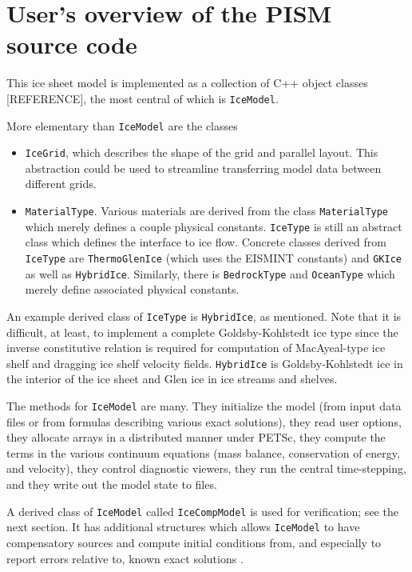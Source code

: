 \documentclass[11pt,final]{amsart}
\renewcommand{\t}[1]{\texttt{#1}}
\begin{document}
\section{User's overview of the PISM source code}  This ice sheet model is implemented as a collection of C++ object classes [REFERENCE], the most central of which is \t{IceModel}.

More elementary than \t{IceModel} are the classes\begin{itemize}
\item \t{IceGrid}, which describes the shape of the grid and parallel
layout. This abstraction could be used to streamline transferring model data between
different grids.
\item \t{MaterialType}.  Various materials are derived from the class \t{MaterialType} which merely defines a couple
physical constants. \t{IceType} is still an abstract class which defines the interface to
ice flow. Concrete classes derived from \t{IceType} are \t{ThermoGlenIce} (which uses the
EISMINT constants) and \t{GKIce} as well as \t{HybridIce}.  Similarly, there is \t{BedrockType} and \t{OceanType} which merely define
associated physical constants.\end{itemize}

An example derived class of \t{IceType} is \t{HybridIce}, as mentioned.  Note that it is difficult, at least, to implement a complete Goldsby-Kohlstedt ice type \cite{GoldsbyKohlstedt} since the inverse constitutive
relation is required for computation of MacAyeal-type ice shelf and dragging ice shelf \cite{MacAyeal} velocity fields. \t{HybridIce} is Goldsby-Kohlstedt ice in the interior of the ice sheet and Glen ice in ice streams and
shelves.

The methods for \t{IceModel} are many.  They initialize the model (from input data files or from formulas describing various exact solutions), they read user options, they allocate arrays in a distributed manner under PETSc, they compute the terms in the various continuum equations (mass balance, conservation of energy, and velocity), they control diagnostic viewers, they run the central time-stepping, and they write out the model state to files.

A derived class of \t{IceModel} called \t{IceCompModel} is used for verification; see the next section.  It has additional structures which allows \t{IceModel} to have compensatory sources and compute initial conditions from, and especially to report errors relative to, known exact solutions \cite{BLKCB,BBL,BB,SchoofStream}.
\end{document}
